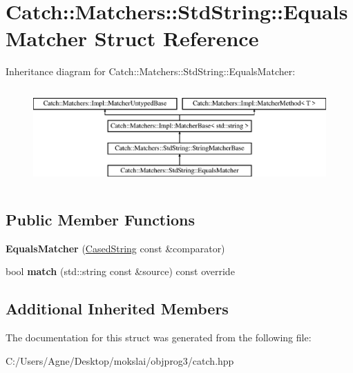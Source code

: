 \hypertarget{struct_catch_1_1_matchers_1_1_std_string_1_1_equals_matcher}{}\section{Catch\+:\+:Matchers\+:\+:Std\+String\+:\+:Equals\+Matcher Struct Reference}
\label{struct_catch_1_1_matchers_1_1_std_string_1_1_equals_matcher}
Inheritance diagram for Catch\+:\+:Matchers\+:\+:Std\+String\+:\+:Equals\+Matcher\+:\begin{figure}[H]
\begin{center}
\leavevmode
\includegraphics[height=3.758389cm]{struct_catch_1_1_matchers_1_1_std_string_1_1_equals_matcher}
\end{center}
\end{figure}
\subsection*{Public Member Functions}
\begin{DoxyCompactItemize}
\item 
\mbox{\label{struct_catch_1_1_matchers_1_1_std_string_1_1_equals_matcher_ab740f1fb2310e9fe3fed5134d4c7e4c8}} 
{\bfseries Equals\+Matcher} (\mbox{\hyperlink{struct_catch_1_1_matchers_1_1_std_string_1_1_cased_string}{Cased\+String}} const \&comparator)
\item 
\mbox{\label{struct_catch_1_1_matchers_1_1_std_string_1_1_equals_matcher_a0bb9d64693f7bb1ef7441062d219f21a}} 
bool {\bfseries match} (std\+::string const \&source) const override
\end{DoxyCompactItemize}
\subsection*{Additional Inherited Members}


The documentation for this struct was generated from the following file\+:\begin{DoxyCompactItemize}
\item 
C\+:/\+Users/\+Agne/\+Desktop/mokslai/objprog3/catch.\+hpp\end{DoxyCompactItemize}
